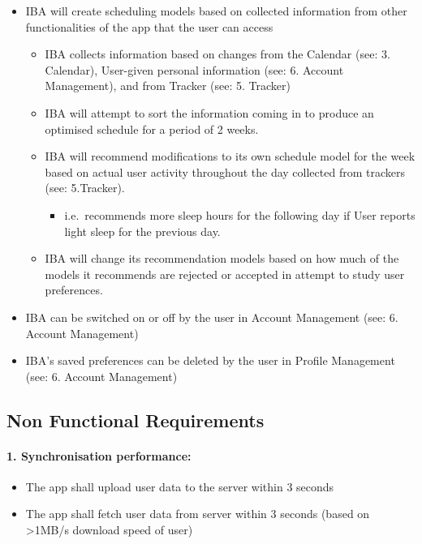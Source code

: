 \documentclass[a4paper,11pt]{article} %
\begin{document}
\begin{itemize}
\item
  IBA will create scheduling models based on collected information from
  other functionalities of the app that the user can access

  \begin{itemize}
  \item
    IBA collects information based on changes from the Calendar (see: 3.
    Calendar), User-given personal information (see: 6. Account
    Management), and from Tracker (see: 5. Tracker)
  \item
    IBA will attempt to sort the information coming in to produce an
    optimised schedule for a period of 2 weeks.
  \item
    IBA will recommend modifications to its own schedule model for the
    week based on actual user activity throughout the day collected from
    trackers (see: 5.Tracker).

    \begin{itemize}
    \item
      i.e.~recommends more sleep hours for the following day if User
      reports light sleep for the previous day.
    \end{itemize}
  \item
    IBA will change its recommendation models based on how much of the
    models it recommends are rejected or accepted in attempt to study
    user preferences.
  \end{itemize}
\item
  IBA can be switched on or off by the user in Account Management (see:
  6. Account Management)
\item
  IBA's saved preferences can be deleted by the user in Profile
  Management (see: 6. Account Management)
\end{itemize}
\newpage
\hypertarget{non-functional-requirements}{%
\subsection{Non Functional Requirements}\label{non-functional-requirements}}

\hypertarget{sync-perf}{%
\paragraph{1. Synchronisation performance:}\label{to-add}}

\begin{itemize}
\item
  The app shall upload user data to the server within 3 seconds
\item
  The app shall fetch user data from server within 3 seconds (based on
  \textgreater1MB/s download speed of user)
\end{itemize}
\end{document}
